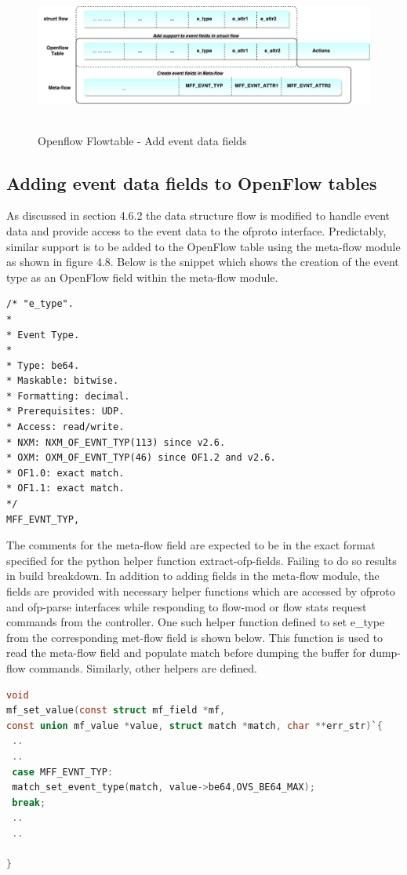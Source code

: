 \begin{figure}[H]
 \centering
 \caption{Openflow Flowtable - Add event data fields}
 \includegraphics[height=5cm]{flowtable.pdf}
\end{figure}

\subsection{Adding event data fields to OpenFlow tables}
 As discussed in section 4.6.2 the data structure flow is modified to handle event data and provide access to the event data to the ofproto interface. Predictably, similar support is to be added to the OpenFlow table using the meta-flow module as shown in figure 4.8. Below is the snippet which shows the creation of the event type as an OpenFlow field within the meta-flow module. \newline

\begin{lstlisting}
/* "e_type".
*
* Event Type.
*
* Type: be64.
* Maskable: bitwise.
* Formatting: decimal.
* Prerequisites: UDP.
* Access: read/write.
* NXM: NXM_OF_EVNT_TYP(113) since v2.6.
* OXM: OXM_OF_EVNT_TYP(46) since OF1.2 and v2.6.
* OF1.0: exact match.
* OF1.1: exact match.
*/    
MFF_EVNT_TYP,
\end{lstlisting}


The comments for the meta-flow field are expected to be in the exact format specified for the python helper function extract-ofp-fields. Failing to do so results in build breakdown. In addition to adding fields in the meta-flow module, the fields are provided with necessary helper functions which are accessed by ofproto and ofp-parse interfaces while responding to flow-mod or flow stats request commands from the controller. One such helper function defined to set e_type from the corresponding met-flow field is shown below. This function is used to read the meta-flow field and populate match before dumping the buffer for dump-flow commands. Similarly, other helpers are defined. \newline
\begin{lstlisting}[language=c]
void
mf_set_value(const struct mf_field *mf,
const union mf_value *value, struct match *match, char **err_str)`{
 ..
 ..
 case MFF_EVNT_TYP:
 match_set_event_type(match, value->be64,OVS_BE64_MAX);
 break; 
 ..
 ..
 
}
\end{lstlisting}

